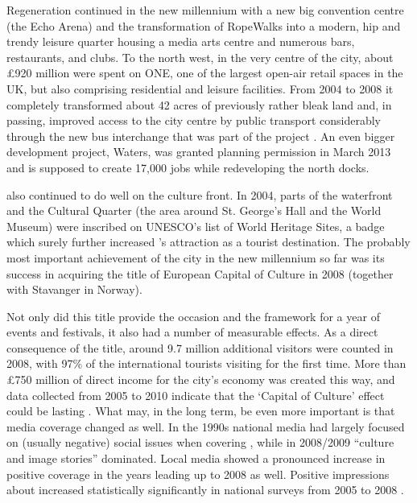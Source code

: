 Regeneration continued in the new millennium with a new big convention centre (the Echo Arena) and the transformation of RopeWalks into a modern, hip and trendy leisure quarter housing a media arts centre and numerous bars, restaurants, and clubs.
To the north west, in the very centre of the city, about £920 million were spent on  ONE, one of the largest open-air retail spaces in the UK, but also comprising residential and leisure facilities.
From 2004 to 2008 it completely transformed about 42 acres of previously rather bleak land and, in passing, improved access to the city centre by public transport considerably through the new bus interchange that was part of the project \parencite[cf.][478--479]{murden2006}.
An even bigger development project,  Waters, was granted planning permission in March 2013 and is supposed to create 17,000 jobs while redeveloping the north docks.

 also continued to do well on the culture front.
In 2004, parts of the waterfront and the Cultural Quarter (the area around St. George's Hall and the World Museum) were inscribed on UNESCO's list of World Heritage Sites, a badge which surely further increased 's attraction as a tourist destination.
The probably most important achievement of the city in the new millennium so far was its success in acquiring the title of European Capital of Culture in 2008 (together with Stavanger in Norway).

Not only did this title provide the occasion and the framework for a year of events and festivals, it also had a number of measurable effects.
As a direct consequence of the title, around 9.7 million additional visitors were counted in 2008, with 97\% of the international tourists visiting for the first time.
More than £750 million of direct income for the city's economy was created this way, and data collected from 2005 to 2010 indicate that the `Capital of Culture' effect could be lasting \parencite{garciaetal2010}.
What may, in the long term, be even more important is that media coverage changed as well.
In the 1990s national media had largely focused on (usually negative) social issues when covering , while in 2008/2009 ``culture and image stories'' dominated.
Local media showed a pronounced increase in positive coverage in the years leading up to 2008 as well.
Positive impressions about  increased statistically significantly in national surveys from 2005 to 2008 \citep[cf.][25 and 44--46]{garciaetal2010}.

